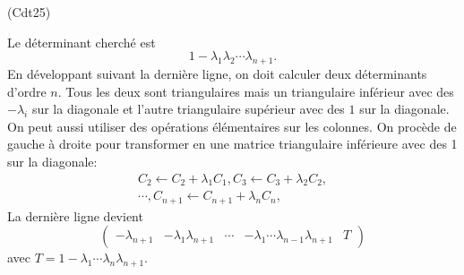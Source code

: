 \begin{tiny}(Cdt25)\end{tiny} Le déterminant cherché est
\begin{displaymath}
  1 - \lambda_1 \lambda_2 \cdots \lambda_{n+1}.
\end{displaymath}
En développant suivant la dernière ligne, on doit calculer deux déterminants d'ordre $n$. Tous les deux sont triangulaires mais un triangulaire inférieur avec des $-\lambda_i$ sur la diagonale et l'autre triangulaire supérieur avec des $1$ sur la diagonale.\newline
On peut aussi utiliser des opérations élémentaires sur les colonnes. On procède de gauche à droite pour transformer en une matrice  triangulaire inférieure avec des 1 sur la diagonale:
\begin{multline*}
  C_2\leftarrow C_2 + \lambda_1 C_1,
  C_3\leftarrow C_3 + \lambda_2 C_2,\\
  \cdots, 
  C_{n+1}\leftarrow C_{n+1} + \lambda_n C_n,
\end{multline*}
La dernière ligne devient
\begin{displaymath}
  \begin{pmatrix}
-\lambda_{n+1} & -\lambda_1\lambda_{n+1} & \cdots & -\lambda_1\cdots \lambda_{n-1}\lambda_{n+1} 
& T     
  \end{pmatrix}
\end{displaymath}
avec $T=1 -\lambda_1\cdots \lambda_{n}\lambda_{n+1}$.
